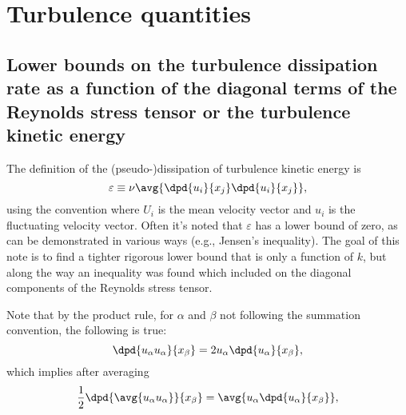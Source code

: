 \documentclass[ccbysa,note,git]{bmtreport}
\begin{document}




\section{Turbulence quantities}

\subsection{Lower bounds on the turbulence dissipation rate as a function of the diagonal terms of the Reynolds stress tensor or the turbulence kinetic energy}

The definition of the (pseudo-)dissipation of turbulence kinetic energy is
\begin{equation}
   \varepsilon \equiv \nu \avg{\dpd{u_i}{x_j} \dpd{u_i}{x_j}},
\end{equation}
using the convention where $U_i$ is the mean velocity vector and $u_i$ is the fluctuating velocity vector. Often it's noted that $\varepsilon$ has a lower bound of zero, as can be demonstrated in various ways (e.g., Jensen's inequality). The goal of this note is to find a tighter rigorous lower bound that is only a function of $k$, but along the way an inequality was found which included on the diagonal components of the Reynolds stress tensor.

Note that by the product rule, for $\alpha$ and $\beta$ not following the summation convention, the following is true:
\begin{equation}
   \dpd{u_\alpha u_\alpha}{x_\beta} = 2 u_\alpha \dpd{u_\alpha}{x_\beta}, %
\end{equation}
which implies after averaging
\begin{equation}
   \frac{1}{2} \dpd{\avg{u_\alpha u_\alpha}}{x_\beta} = \avg{u_\alpha \dpd{u_\alpha}{x_\beta}}, \label{eq:diag to individual}
\end{equation}
\end{document}
